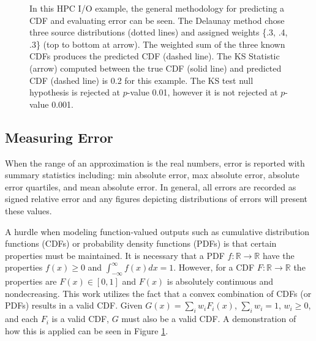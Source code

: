 \documentclass[sigconf]{acmart}
\begin{document}
\begin{figure}[htb]
  \vspace{-0.3cm}
  \caption{In this HPC I/O example, the general methodology for predicting a CDF and evaluating error can be seen. The Delaunay method chose three source distributions (dotted lines) and assigned weights \{.3, .4, .3\} (top to bottom at arrow). The weighted sum of the three known CDFs produces the predicted CDF (dashed line). The KS Statistic (arrow) computed between the true CDF (solid line) and predicted CDF (dashed line) is 0.2 for this example. The KS test null hypothesis is rejected at $p$-value 0.01, however it is not rejected at $p$-value 0.001.
  \vspace{-.1cm}}
  \label{fig:prediction_example}
\end{figure}

\subsection{Measuring Error}

When the range of an approximation is the real numbers, error is reported with summary statistics including: min absolute error, max absolute error, absolute error quartiles, and mean absolute error. In general, all errors are recorded as signed relative error and any figures depicting distributions of errors will present these values.

A hurdle when modeling function-valued outputs such as cumulative distribution functions (CDFs) or probability density functions (PDFs) is that certain properties must be maintained. It is necessary that a PDF $f: \mathbb{R} \rightarrow \mathbb{R}$ have the properties $f(x) \geq 0$ and $\int_{-\infty}^{\infty}f(x)dx = 1$. However, for a CDF $F: \mathbb{R} \rightarrow \mathbb{R}$ the properties are $F(x) \in [0,1]$ and $F(x)$ is absolutely continuous and nondecreasing. This work utilizes the fact that a convex combination of CDFs (or PDFs) results in a valid CDF. Given $G(x) = \sum_{i}w_i F_i(x)$, $\sum_{i} w_i = 1$, $w_i \geq 0$, and each $F_i$ is a valid CDF, $G$ must also be a valid CDF. A demonstration of how this is applied can be seen in Figure \ref{fig:prediction_example}.
\end{document}
